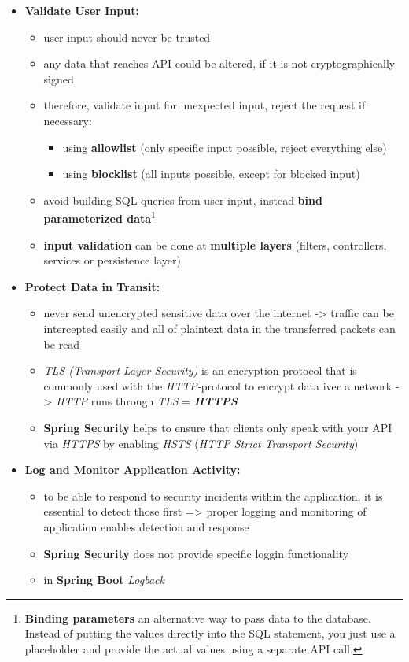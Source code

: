 \documentclass[ieeetran]{article}
\begin{document}
\begin{itemize}
\item \textbf{Validate User Input:}
	\begin{itemize}
	  \item user input should never be trusted
	\item any data that reaches API could be altered, if it is not cryptographically signed
	\item therefore, validate input for unexpected input, reject the request if necessary:
		\begin{itemize}
		  \item using \textbf{allowlist} (only specific input possible, reject everything else)
		\item using \textbf{blocklist} (all inputs possible, except for blocked input)
		\end{itemize}
\pagebreak
	\item avoid building SQL queries from user input, instead \textbf{bind parameterized data}\footnote{\textbf{Binding parameters} an alternative way to pass data to the database. Instead of putting the values directly into the SQL statement, you just use a placeholder and provide the actual values using a separate API call.}

\item \textbf{input validation} can be done at \textbf{multiple layers} (filters, controllers, services or persistence layer)

	\end{itemize}

\item \textbf{Protect Data in Transit:}
	\begin{itemize}
	  \item never send unencrypted sensitive data over the internet -> traffic can be intercepted easily and all of plaintext data in the transferred packets can be read
	  \item \textit{TLS (Transport Layer Security)} is an encryption protocol that is commonly used with the \textit{HTTP-}protocol to encrypt data iver a network -> \textit{HTTP} runs through \textit{TLS} = \textbf{\textit{HTTPS}}

	\item \textbf{Spring Security} helps to ensure that clients only speak with your API via \textit{HTTPS} by enabling \textit{HSTS} (\textit{HTTP Strict Transport Security})
	\end{itemize}

\item \textbf{Log and Monitor Application Activity:}
	\begin{itemize}
	  \item to be able to respond to security incidents within the application, it is essential to detect those first => proper logging and monitoring of application enables detection and response
	\item \textbf{Spring Security} does not provide specific loggin functionality
	\item in \textbf{Spring Boot} \textit{Logback}


\end{itemize}
\end{itemize}
\end{document}
